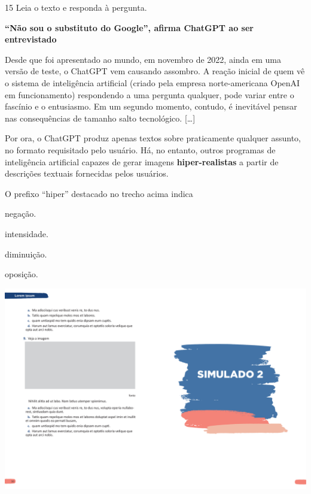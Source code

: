 \num{15} Leia o texto e responda à pergunta.

\begin{myquote}
\textbf{``Não sou o substituto do Google'', afirma ChatGPT ao ser entrevistado}

Desde que foi apresentado ao mundo, em novembro de 2022, ainda em uma
versão de teste, o ChatGPT vem causando assombro. A reação inicial de
quem vê o sistema de inteligência artificial (criado pela empresa
norte-americana OpenAI em funcionamento) respondendo a uma pergunta
qualquer, pode variar entre o fascínio e o entusiasmo. Em um segundo
momento, contudo, é inevitável pensar nas consequências de tamanho salto
tecnológico. {[}\ldots{}{]}

Por ora, o ChatGPT produz apenas textos sobre praticamente qualquer
assunto, no formato requisitado pelo usuário. Há, no entanto, outros
programas de inteligência artificial capazes de gerar imagens
\textbf{hiper-realistas} a partir de descrições textuais fornecidas pelos
usuários.

\end{myquote}

O prefixo ``hiper'' destacado no trecho acima indica

\begin{escolha}
  \item negação.

  \item intensidade.

  \item diminuição.

  \item oposição.
\end{escolha}
\pagebreak

\vspace*{-3.4cm}
\hspace*{-3.7cm}\includegraphics[scale=1]{../watermarks/2simulado5ano.pdf}
\pagebreak

